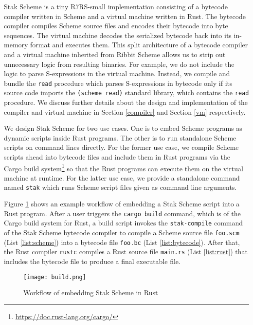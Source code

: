 \documentclass[sigplan]{acmart}
\begin{document}
Stak Scheme is a tiny R7RS-small implementation consisting of a
bytecode compiler written in Scheme and a virtual machine written in Rust.
The bytecode compiler compiles Scheme source files and encodes their bytecode
into byte sequences.
The virtual machine decodes the serialized bytecode back into its
in-memory format and executes them.
This split architecture of a bytecode compiler and a virtual machine inherited
from Ribbit Scheme allows us to strip
out unnecessary logic from resulting binaries.
For example, we do not include the logic to parse S-expressions
in the virtual machine.
Instead, we compile and bundle the \texttt{read} procedure which parses
S-expressions in bytecode only if its source code imports the
\texttt{(scheme read)} standard library, which contains the
\texttt{read} procedure.
We discuss further details about the design and implementation of the
compiler and virtual machine in Section \ref{compiler} and Section
\ref{vm} respectively.

We design Stak Scheme for two use cases. One is to embed Scheme
programs as dynamic scripts inside Rust programs.
The other is to run standalone Scheme scripts on command lines directly.
For the former use case, we
compile Scheme scripts ahead into bytecode files and include them in
Rust programs via the Cargo build
system\footnote{\url{https://doc.rust-lang.org/cargo/}} so that the
Rust programs can execute them on the virtual machine at runtime.
For the latter use case, we
provide a standalone command named \texttt{stak} which runs Scheme script
files given as command line arguments.

Figure \ref{figure:build} shows an example workflow of
embedding a Stak Scheme script into a Rust program.
After a user triggers the \texttt{cargo build} command, which is of the
Cargo build system for Rust, a build
script invokes the \texttt{stak-compile} command of the Stak Scheme
bytecode compiler to compile a Scheme source file \texttt{foo.scm}
(List \ref{list:scheme}) into a bytecode file \texttt{foo.bc}
(List \ref{list:bytecode}).
After that, the Rust compiler \texttt{rustc} compiles a Rust source file
\texttt{main.rs} (List \ref{list:rust}) that includes the bytecode
file to produce a final executable file.

\begin{figure}
  \begin{center}
    \texttt{[image: build.png]}

    \caption{Workflow of embedding Stak Scheme in Rust}
    \label{figure:build}
  \end{center}
\end{figure}
\end{document}
